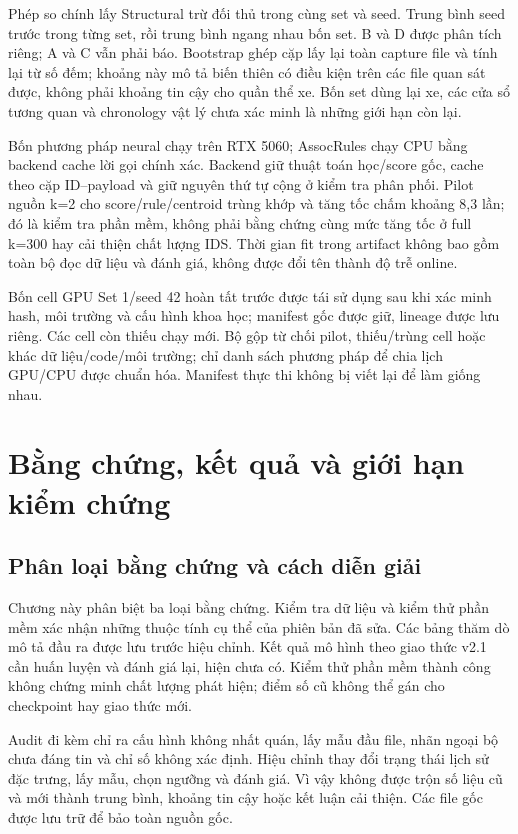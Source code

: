 \documentclass[12pt,a4paper,oneside,openany]{extbook}
\begin{document}
Phép so chính lấy Structural trừ đối thủ trong cùng set và seed. Trung bình seed trước trong từng set, rồi trung bình ngang nhau bốn set. B và D được phân tích riêng; A và C vẫn phải báo. Bootstrap ghép cặp lấy lại toàn capture file và tính lại từ số đếm; khoảng này mô tả biến thiên có điều kiện trên các file quan sát được, không phải khoảng tin cậy cho quần thể xe. Bốn set dùng lại xe, các cửa sổ tương quan và chronology vật lý chưa xác minh là những giới hạn còn lại.

Bốn phương pháp neural chạy trên RTX 5060; AssocRules chạy CPU bằng backend cache lời gọi chính xác. Backend giữ thuật toán học/score gốc, cache theo cặp ID--payload và giữ nguyên thứ tự cộng ở kiểm tra phân phối. Pilot nguồn k=2 cho score/rule/centroid trùng khớp và tăng tốc chấm khoảng 8,3 lần; đó là kiểm tra phần mềm, không phải bằng chứng cùng mức tăng tốc ở full k=300 hay cải thiện chất lượng IDS. Thời gian fit trong artifact không bao gồm toàn bộ đọc dữ liệu và đánh giá, không được đổi tên thành độ trễ online.

Bốn cell GPU Set 1/seed 42 hoàn tất trước được tái sử dụng sau khi xác minh hash, môi trường và cấu hình khoa học; manifest gốc được giữ, lineage được lưu riêng. Các cell còn thiếu chạy mới. Bộ gộp từ chối pilot, thiếu/trùng cell hoặc khác dữ liệu/code/môi trường; chỉ danh sách phương pháp để chia lịch GPU/CPU được chuẩn hóa. Manifest thực thi không bị viết lại để làm giống nhau.


\chapter{Bằng chứng, kết quả và giới hạn kiểm chứng}\label{chap:results}
\section{Phân loại bằng chứng và cách diễn giải}
Chương này phân biệt ba loại bằng chứng. Kiểm tra dữ liệu và kiểm thử phần mềm xác nhận những thuộc tính cụ thể của phiên bản đã sửa. Các bảng thăm dò mô tả đầu ra được lưu trước hiệu chỉnh. Kết quả mô hình theo giao thức v2.1 cần huấn luyện và đánh giá lại, hiện chưa có. Kiểm thử phần mềm thành công không chứng minh chất lượng phát hiện; điểm số cũ không thể gán cho checkpoint hay giao thức mới.

Audit đi kèm chỉ ra cấu hình không nhất quán, lấy mẫu đầu file, nhãn ngoại bộ chưa đáng tin và chỉ số không xác định. Hiệu chỉnh thay đổi trạng thái lịch sử đặc trưng, lấy mẫu, chọn ngưỡng và đánh giá. Vì vậy không được trộn số liệu cũ và mới thành trung bình, khoảng tin cậy hoặc kết luận cải thiện. Các file gốc được lưu trữ để bảo toàn nguồn gốc.
\end{document}
